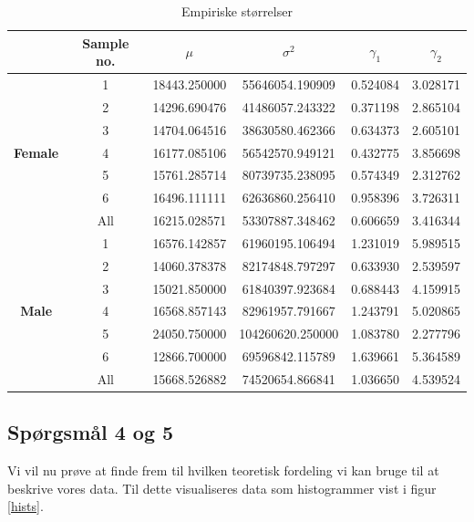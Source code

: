 \documentclass[a4paper, 10pt, danish, final]{article}
\begin{document}
\begin{table}
    \centering
    \begin{tabular}{|c|c|c|c|c|c|}
        \hline
        & \textbf{Sample no.} & $\mu$ & $\sigma^2$ & $\gamma_1$ & $\gamma_2$\\
        \hline
        \multirow{7}{*}{\textbf{Female}}
        & 1 & 18443.250000 & 55646054.190909 & 0.524084 & 3.028171 \\
        & 2 & 14296.690476 & 41486057.243322 & 0.371198 & 2.865104 \\
        & 3 & 14704.064516 & 38630580.462366 & 0.634373 & 2.605101 \\
        & 4 & 16177.085106 & 56542570.949121 & 0.432775 & 3.856698 \\
        & 5 & 15761.285714 & 80739735.238095 & 0.574349 & 2.312762 \\
        & 6 & 16496.111111 & 62636860.256410 & 0.958396 & 3.726311 \\
        \hline
        & All & 16215.028571 & 53307887.348462 & 0.606659 & 3.416344 \\
        \hline
        \hline
        \multirow{7}{*}{\textbf{Male}}
        & 1 & 16576.142857 & 61960195.106494 & 1.231019 & 5.989515 \\
        & 2 & 14060.378378 & 82174848.797297 & 0.633930 & 2.539597 \\
        & 3 & 15021.850000 & 61840397.923684 & 0.688443 & 4.159915 \\
        & 4 & 16568.857143 & 82961957.791667 & 1.243791 & 5.020865 \\
        & 5 & 24050.750000 & 104260620.250000 & 1.083780 & 2.277796 \\
        & 6 & 12866.700000 & 69596842.115789 & 1.639661 & 5.364589 \\
        \hline
        & All & 15668.526882 & 74520654.866841 & 1.036650 & 4.539524 \\
        \hline
    \end{tabular}
    \caption{Empiriske størrelser}
    \label{emp}
\end{table}

\subsection*{Spørgsmål 4 og 5}
Vi vil nu prøve at finde frem til hvilken teoretisk fordeling vi kan
bruge til at beskrive vores data. Til dette visualiseres data som
histogrammer vist i figur \ref{hists}.
\end{document}
